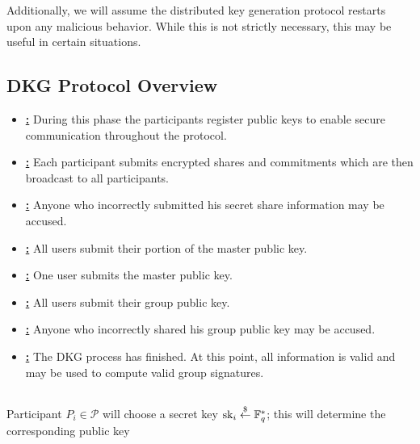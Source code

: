 Additionally, we will assume the \gls{distributed key generation} protocol
restarts upon any malicious behavior.
While this is not strictly necessary, this may be useful in certain situations.

\subsection*{DKG Protocol Overview}

\begin{itemize}
\item \hyperref[ssec:secret_dkg_registration]{\textbf{\Registration{}:}}
    During this phase the participants register public keys
    to enable secure communication throughout the protocol.
\item \hyperref[ssec:secret_dkg_share_submission]{\textbf{\ShareSubmission{}:}}
    Each participant submits encrypted shares and commitments
    which are then broadcast to all participants.
\item \hyperref[ssec:secret_dkg_share_dispute]{\textbf{\ShareDispute{}:}}
    Anyone who incorrectly submitted his secret share information
    may be accused.
\item \hyperref[ssec:secret_dkg_key_share]{\textbf{\KeyShareSubmission{}:}}
    All users submit their portion of the master public key.
\item \hyperref[ssec:secret_dkg_mpk]{\textbf{\MPKSubmission{}:}}
    One user submits the master public key.
\item \hyperref[ssec:secret_dkg_gpk_submission]{\textbf{\GPKSubmission{}:}}
    All users submit their group public key.
\item \hyperref[ssec:secret_dkg_gpk_dispute]{\textbf{\GPKDispute{}:}}
    Anyone who incorrectly shared his group public key may be accused.
\item \hyperref[ssec:secret_dkg_completion]{\textbf{\Completion{}:}}
    The DKG process has finished.
    At this point, all information is valid and may be used to compute
    valid group signatures.
\end{itemize}

\subsection{\Registration{}}
\label{ssec:secret_dkg_registration}

Participant $P_{i}\in\mathcal{P}$ will choose a secret key
$\textrm{sk}{}_{i}\stackrel{\$}{\leftarrow}{}\mathbb{F}_{q}^{*}$;
this will determine the corresponding public key

